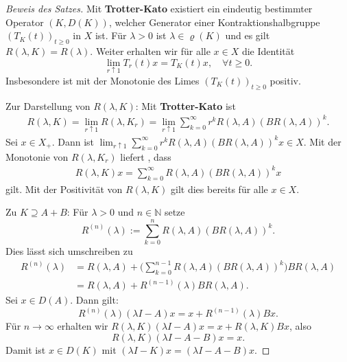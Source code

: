 \begin{proof}[Beweis des Satzes]
\par
Mit \textbf{Trotter-Kato} existiert ein eindeutig bestimmter Operator $(K, D(K))$, welcher Generator einer Kontraktionshalbgruppe $(T_K(t))_{t\geq0}$ in $X$ ist. Für $\lambda>0$ ist $\lambda\in\varrho(K)$ und es gilt $R(\lambda, K)=R(\lambda)$. Weiter erhalten wir für alle $x\in X$ die Identität
\begin{equation*}
\lim_{r\uparrow 1} T_r(t)x = T_K(t)x,\quad\forall t\geq0.
\end{equation*}
Insbesondere ist mit der Monotonie des Limes $(T_K(t))_{t\geq0}$ positiv.

\par
Zur Darstellung von $R(\lambda, K)$: Mit \textbf{Trotter-Kato} ist
\begin{align*}
R(\lambda, K)=\lim_{r\uparrow1}R(\lambda, K_r)=\lim_{r\uparrow 1}\sum_{k=0}^\infty r^k R(\lambda, A)(BR(\lambda, A))^k.
\end{align*}
Sei $x\in X_+$. Dann ist $\lim_{r\uparrow 1}\sum_{k=0}^\infty r^k R(\lambda, A)(BR(\lambda, A))^k x\in X$. Mit der Monotonie von $R(\lambda, K_r)$ liefert \Cref{}, dass  
\begin{align*}
R(\lambda, K)x=\sum_{k=0}^\infty R(\lambda, A)(BR(\lambda, A))^kx
\end{align*}
gilt. Mit der Positivität von $R(\lambda, K)$ gilt dies bereits für alle $x\in X$.

\par
Zu $K\supseteq A+B$: Für $\lambda>0$ und  $n\in \mathbb N$ setze
\begin{equation*}
R^{(n)}(\lambda) := \sum_{k=0}^n R(\lambda, A)(BR(\lambda, A))^k.
\end{equation*}
Dies lässt sich umschreiben zu
\begin{align*}
R^{(n)}(\lambda) 
&= R(\lambda, A) + \Bigg(\sum_{k=0}^{n-1}R(\lambda, A) (BR(\lambda, A))^k\Bigg) BR(\lambda,  A)\\
&= R(\lambda, A) + R^{(n-1)}(\lambda) B R(\lambda, A).
\end{align*}
Sei $x\in D(A)$. Dann gilt:
\begin{equation*}
R^{(n)}(\lambda)(\lambda I -A)x = x + R^{(n-1)}(\lambda)Bx.
\end{equation*}
Für $n\to \infty$ erhalten wir $R(\lambda, K)(\lambda I- A)x=x+R(\lambda, K)Bx$, also
\begin{equation*}
R(\lambda, K)(\lambda I -A-B)x=x.
\end{equation*}
Damit ist $x\in D(K)$ mit $(\lambda I -K)x = (\lambda I -A-B)x$.
\end{proof}

